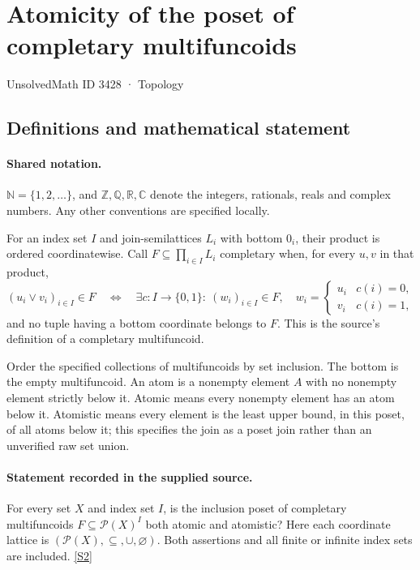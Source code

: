 \documentclass[11pt]{article}
\newcommand{\sref}[2]{\hyperlink{source:#1:#2}{[S#2]}}
\begin{document}
\setcounter{section}{3427}
\section{Atomicity of the poset of completary multifuncoids}\label{3428}
{\small\sffamily UnsolvedMath ID 3428 · Topology}
\subsection{Definitions and mathematical statement}

\paragraph{Shared notation.}$\mathbb N=\{1,2,\ldots\}$, and $\mathbb Z,\mathbb Q,\mathbb R,\mathbb C$ denote the integers, rationals, reals and complex numbers. Any other conventions are specified locally.


For an index set $I$ and join-semilattices $L_i$ with bottom $0_i$, their product is ordered coordinatewise. Call $F\subseteq\prod_{i\in I}L_i$ completary when, for every $u,v$ in that product,
\[
 (u_i\vee v_i)_{i\in I}\in F
 \quad\Longleftrightarrow\quad
 \exists c:I\to\{0,1\}:\ (w_i)_{i\in I}\in F,
 \quad w_i=\begin{cases}u_i&c(i)=0,\\v_i&c(i)=1,\end{cases}
\]
and no tuple having a bottom coordinate belongs to $F$. This is the source's definition of a completary multifuncoid.

Order the specified collections of multifuncoids by set inclusion. The bottom is the empty multifuncoid. An atom is a nonempty element $A$ with no nonempty element strictly below it. Atomic means every nonempty element has an atom below it. Atomistic means every element is the least upper bound, in this poset, of all atoms below it; this specifies the join as a poset join rather than an unverified raw set union.
\paragraph{Statement recorded in the supplied source.}
For every set $X$ and index set $I$, is the inclusion poset of completary multifuncoids $F\subseteq\mathcal P(X)^I$ both atomic and atomistic? Here each coordinate lattice is $(\mathcal P(X),\subseteq,\cup,\varnothing)$. Both assertions and all finite or infinite index sets are included. \sref{3428}{2}
\end{document}
